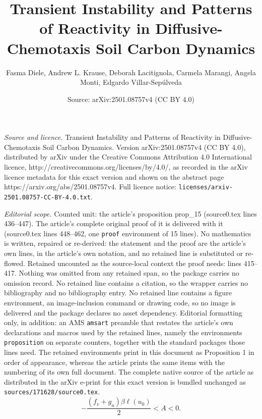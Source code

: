 \documentclass[10pt,a4paper]{amsart}
\title{Transient Instability and Patterns of Reactivity in Diffusive-Chemotaxis Soil Carbon Dynamics}
\author{Fasma Diele, Andrew L. Krause, Deborah Lacitignola, Carmela Marangi, Angela Monti, Edgardo Villar-Sep\'ulveda}
\date{Source: arXiv:2501.08757v4 (CC BY 4.0)}
\begin{document}
\maketitle

\noindent\emph{Source and licence.} Transient Instability and Patterns of Reactivity in Diffusive-Chemotaxis Soil Carbon Dynamics. Version arXiv:2501.08757v4 (CC BY 4.0), distributed by arXiv under the Creative Commons Attribution 4.0 International licence, http://creativecommons.org/licenses/by/4.0/, as recorded in the arXiv licence metadata for this exact version and shown on the abstract page https://arxiv.org/abs/2501.08757v4. Full licence notice: \texttt{licenses/arxiv-2501.08757-CC-BY-4.0.txt}.\par\smallskip

\noindent\textit{Editorial scope.} Counted unit: the article's proposition prop\_15 (source0.tex lines 436--447). The article's complete original proof of it is delivered with it (source0.tex lines 448--462, one \texttt{proof} environment of 15 lines). No mathematics is written, repaired or re-derived: the statement and the proof are the article's own lines, in the article's own notation, and no retained line is substituted or re-flowed.  Retained uncounted as the source-local context the proof needs: lines 415--417.  Nothing was omitted from any retained span, so the package carries no omission record.  No retained line contains a citation, so the wrapper carries no bibliography and no bibliography entry.  No retained line contains a figure environment, an image-inclusion command or drawing code, so no image is delivered and the package declares no asset dependency.  Editorial formatting only, in addition: an AMS \texttt{amsart} preamble that restates the article's own declarations and macros used by the retained lines, namely the environments \texttt{proposition} on separate counters, together with the standard packages those lines need.  The retained environments print in this document as Proposition 1 in order of appearance, whereas the article prints the same items with the numbering of its own full document.  The complete native source of the article as distributed in the arXiv e-print for this exact version is bundled unchanged as \texttt{sources/171628/source0.tex}.
\begin{equation}\label{eq:k2minimo2}
  - \frac{(f_v+g_u)\beta \ell(u_0) }{2} < A <0.
\end{equation}
\end{document}
